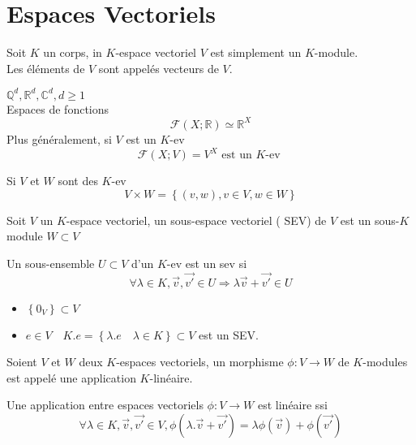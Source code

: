 \documentclass[../main.tex]{subfiles}
\begin{document}
\section{Espaces Vectoriels}

\begin{defn}
	Soit $K$ un corps, in $K$-espace vectoriel $V$ est simplement un $K$-module.\\
	Les éléments de $V$ sont appelés vecteurs de $V$.

\end{defn}
\begin{exemple}
$\mathbb{Q}^{d}, \mathbb{R}^{d}, \mathbb{C}^{d}, d \geq 1$\\
Espaces de fonctions
\[ 
	\mathcal{F}(X;\mathbb{R}) \simeq \mathbb{R}^{X}
\]
Plus généralement, si $V$ est un $K$-ev
\[ 
	\mathcal{F}(X;V)=V^{X} \text{ est un $K$-ev } 
\]


\end{exemple}
\begin{defn}[Produit]
Si $V$ et $W$ sont des $K$-ev
\[ 
	V\times W = \left\{ ( v,w), v\in V, w \in W \right\} 
\]

\end{defn}
\begin{defn}
	Soit $V$ un $K$-espace vectoriel, un sous-espace vectoriel ( SEV) de $V$ est un sous-$K$ module $W \subset V$
\end{defn}
\begin{propo}
Un sous-ensemble $U\subset V$ d'un $K$-ev est un sev
si
\[ 
\forall \lambda\in K, \vec{v}, \vec{v'} \in U \Rightarrow \lambda \vec{v} + \vec{v'} \in U
\]

\end{propo}
\begin{exemple}
\begin{itemize}
\item $ \left\{ 0_V \right\} \subset V$
\item $e \in V\quad K.e = \left\{ \lambda.e\quad \lambda \in K \right\} \subset V$ est un SEV.
\end{itemize}

\end{exemple}
\begin{defn}
Soient $V$ et $W$ deux $K$-espaces vectoriels, un morphisme $\phi:V\to W$ de $K$-modules est appelé une application $K$-linéaire.
\end{defn}
\begin{propo}
	Une application entre espaces vectoriels $\phi: V \to W$ est linéaire ssi
	\[ 
		\forall \lambda \in K, \vec{v}, \vec{v'} \in V, \phi(\lambda.\vec{v} +\vec{v'}) = \lambda\phi(\vec{v})+\phi(\vec{v'})
	\]
	

\end{propo}
\end{document}
